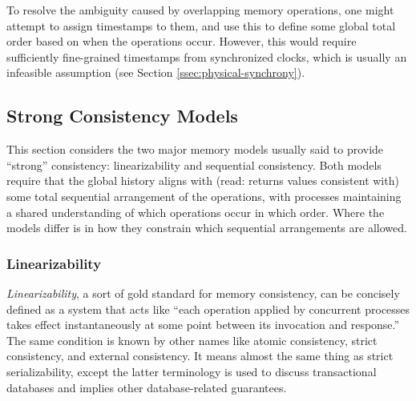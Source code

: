 \documentclass[]             %
{NASA}                       %
\theoremstyle{definition}
\begin{document}
To resolve the ambiguity caused by overlapping memory operations, one
might attempt to assign timestamps to them, and use this to define
some global total order based on when the operations occur. However,
this would require sufficiently fine-grained timestamps from
synchronized clocks, which is usually an infeasible assumption (see
Section \ref{ssec:physical-synchrony}). %

\subsection{Strong Consistency Models}
\label{ssec:strong-consistency}
This section considers the two major memory models usually said
to provide ``strong'' consistency: linearizability and sequential
consistency. Both models require that the global history aligns with
(read: returns values consistent with) some total sequential arrangement of the operations, with processes maintaining a shared understanding of which operations occur
in which order. Where the models differ is in how they constrain which
sequential arrangements are allowed.


\subsubsection{Linearizability}
\label{sssec:linearizability}

\emph{Linearizability}, a sort of gold standard for memory
consistency, can be concisely defined as a system that acts like
``each operation applied by concurrent processes takes effect
instantaneously at some point between its invocation and response.''
\cite{10.1145/78969.78972} The same condition is known by other names
like atomic consistency, strict consistency, and external
consistency. It means almost the same thing as strict serializability,
except the latter terminology is used to discuss transactional
databases and implies other database-related guarantees.
\end{document}
